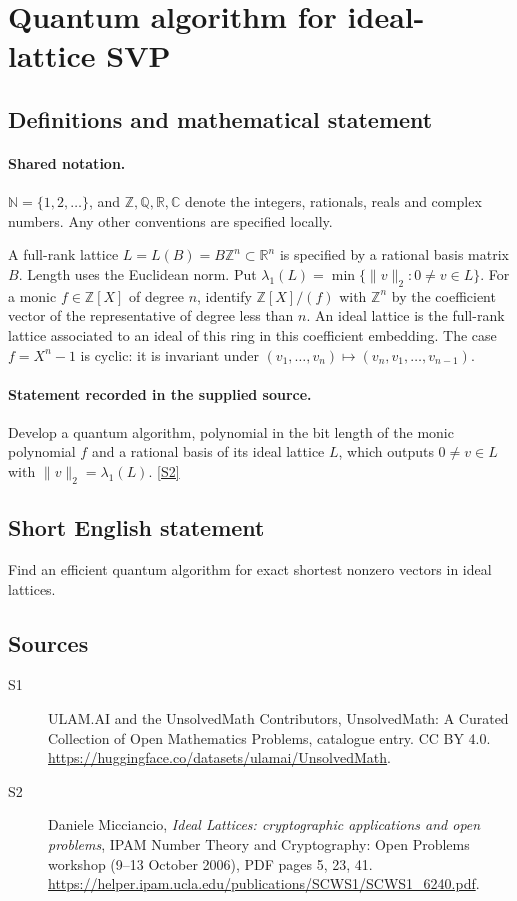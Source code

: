 \documentclass[11pt]{article}
\newcommand{\sref}[2]{\hyperlink{source:#1:#2}{[S#2]}}
\begin{document}
\section{Quantum algorithm for ideal-lattice SVP}\label{statement}

\subsection{Definitions and mathematical statement}

\paragraph{Shared notation.}$\mathbb N=\{1,2,\ldots\}$, and $\mathbb Z,\mathbb Q,\mathbb R,\mathbb C$ denote the integers, rationals, reals and complex numbers. Any other conventions are specified locally.


A full-rank lattice $L=L(B)=B\mathbb Z^n\subset\mathbb R^n$ is specified by a rational basis matrix $B$. Length uses the Euclidean norm. Put $\lambda_1(L)=\min\{\|v\|_2:0\ne v\in L\}$. For a monic $f\in\mathbb Z[X]$ of degree $n$, identify $\mathbb Z[X]/(f)$ with $\mathbb Z^n$ by the coefficient vector of the representative of degree less than $n$. An ideal lattice is the full-rank lattice associated to an ideal of this ring in this coefficient embedding. The case $f=X^n-1$ is cyclic: it is invariant under $(v_1,\ldots,v_n)\mapsto(v_n,v_1,\ldots,v_{n-1})$.
\paragraph{Statement recorded in the supplied source.}
Develop a quantum algorithm, polynomial in the bit length of the monic polynomial $f$ and a rational basis of its ideal lattice $L$, which outputs $0\ne v\in L$ with $\|v\|_2=\lambda_1(L)$. \sref{statement}{2}

\subsection{Short English statement}
Find an efficient quantum algorithm for exact shortest nonzero vectors in ideal lattices.
\subsection{Sources}
\begin{description}
\item[\hypertarget{source:statement:1}{S1}] ULAM.AI and the UnsolvedMath Contributors, UnsolvedMath: A Curated Collection of Open Mathematics Problems, catalogue entry. CC BY 4.0. \url{https://huggingface.co/datasets/ulamai/UnsolvedMath}.
\item[\hypertarget{source:statement:2}{S2}] Daniele Micciancio, \emph{Ideal Lattices: cryptographic applications and open problems}, IPAM Number Theory and Cryptography: Open Problems workshop (9--13 October 2006), PDF pages 5, 23, 41. \url{https://helper.ipam.ucla.edu/publications/SCWS1/SCWS1_6240.pdf}.
\end{description}
\label{end:statement}
\end{document}
